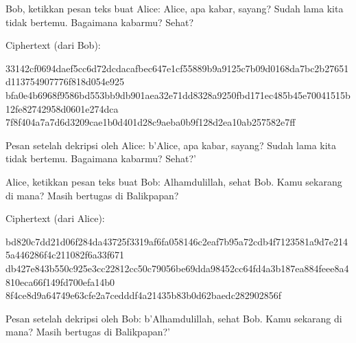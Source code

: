\documentclass{article}
\begin{document}

Bob, ketikkan pesan teks buat Alice: Alice, apa kabar, sayang? Sudah lama kita tidak bertemu. Bagaimana kabarmu?
Sehat?

Ciphertext (dari Bob):

33142cf0694daef5cc6d72dcdacafbec647e1cf55889b9a9125c7b09d0168da7bc2b27651d113754907776f818d054e925
bfa0e4b6968f9586bd553bb9db901aea32e71dd8328a9250fbd171ec485b45e70041515b12fe82742958d0601e274dca
7f8f404a7a7d6d3209cae1b0d401d28c9aeba0b9f128d2ea10ab257582e7ff

Pesan setelah dekripsi oleh Alice: b'Alice, apa kabar, sayang? Sudah lama kita tidak bertemu. Bagaimana kabarmu?
Sehat?'

Alice, ketikkan pesan teks buat Bob: Alhamdulillah, sehat Bob. Kamu sekarang di mana? Masih bertugas di
Balikpapan?

Ciphertext (dari Alice):

bd820c7dd21d06f284da43725f3319af6fa058146c2eaf7b95a72cdb4f7123581a9d7e2145a446286f4c211082f6a33f671
db427e843b550c925e3cc22812cc50c79056be69dda98452cc64fd4a3b187ea884feee8a4810eca66f149fd700efa14b0
8f4ce8d9a64749e63cfe2a7cedddf4a21435b83b0d62baedc282902856f

Pesan setelah dekripsi oleh Bob: b'Alhamdulillah, sehat Bob. Kamu sekarang di mana? Masih bertugas di Balikpapan?'
\end{document}
